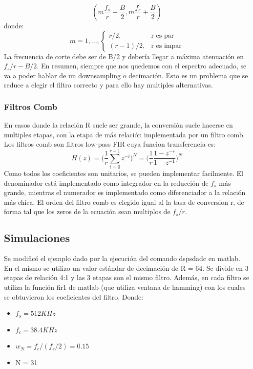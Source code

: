 \documentclass[assd_tp3_main.tex]{subfiles}
\begin{document}
\[ (m\frac{f_s}{r}-\frac{B}{2},m\frac{f_s}{r}+\frac{B}{2}) \]
donde:\\

\begin{equation}
    m = 1,...,
    \begin{cases}
      r/2, & \text{r es par} \\
      (r-1)/2, & \text{r es impar}
    \end{cases}
  \end{equation}
La frecuencia de corte debe ser de B/2 y debería llegar a máxima atenuación en $f_s/r-B/2$.
En resumen, siempre que nos quedemos con el espectro adecuado, se va a poder hablar de un downsampling o decimación. Esto es un problema que se reduce a elegir el filtro correcto y para ello hay multiples alternativas.
\subsubsection{Filtros Comb}
En casos donde la relación R suele ser grande, la conversión suele hacerse en multiples etapas, con la etapa de más relación implementada por un filtro comb.
Los filtros comb son filtros low-pass FIR cuya funcion transferencia es:
$$H(z)=\Bigg(\frac{1}{r}\sum_{i=0}^{r-1} z^{-i}\Bigg)^N = \Bigg(\frac{1}{r}\frac{1-z^{-r}}{1-z^{-1}}\Bigg)^N$$
Como todos los coeficientes son unitarios, se pueden implementar facilmente.
El denominador está implementado como integrador en la reducción de $f_s$ más grande, mientras el numerador es implementado como diferenciador a la relación más chica. El orden del filtro comb es elegido igual al la tasa de conversion r, de forma tal que los zeros de la ecuación sean multiplos de $f_s/r$.
\newpage
\subsection{Simulaciones}
Se modificó el ejemplo dado por la ejecución del comando dspsdadc en matlab. En el mismo se  utilizo un valor estándar de decimación de R = 64. Se divide en 3 etapas de relación 4:1 y las 3 etapas son el mismo filtro.
Además, en cada filtro se utiliza la función fir1 de matlab (que utiliza ventana de hamming) con los cuales se obtuvieron los coeficientes del filtro.
Donde:
\begin{itemize}
\item $f_s = 512KHz$
\item $f_c = 38.4KHz$
\item $w_N = f_c/(f_s/2) = 0.15$
\item N = 31
\end{itemize}
\end{document}
